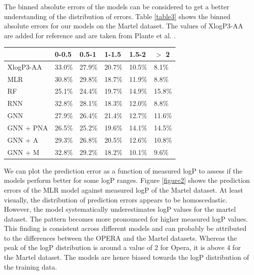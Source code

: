 \documentclass{article}
\theoremstyle{definition}
\theoremstyle{remark}
\begin{document}
The binned absolute errors of the models can be considered to get a better understanding of the distribution of errors. Table \ref{table3} shows the binned absolute errors for our models on the Martel dataset. The values of XlogP3-AA are added for reference and are taken from Plante et al. \cite{plante2018jplogp}. \\

\begin{center}
\begin{tabular}{ | m{2.0cm} | m{1.0cm}| m{1.0cm}| m{1.0cm}| m{1.0cm}| m{1.0cm}| } 
  \hline
   & 0-0.5 & 0.5-1 & 1-1.5 & 1.5-2 & $>$ 2  \\ 
   \hline
   XlogP3-AA & 33.0\% & 27.9\% & 20.7\% & 10.5\% & 8.1\%  \\
  \hline
   MLR & 30.8\% & 29.8\% & 18.7\% & 11.9\% & 8.8\%  \\ 
  \hline
  RF & 25.1\% & 24.4\% & 19.7\% & 14.9\% & 15.8\%  \\ 
  \hline
  RNN & 32.8\% & 28.1\% & 18.3\% & 12.0\% & 8.8\%  \\ 
  \hline
  GNN & 27.9\% & 26.4\% & 21.4\% & 12.7\% & 11.6\%  \\ 
  \hline
  GNN + PNA & 26.5\% & 25.2\% & 19.6\% & 14.1\% & 14.5\%  \\ 
  \hline
  GNN + A & 29.3\% & 26.8\% & 20.5\% & 12.6\% & 10.8\% \\ 
  \hline
  GNN + M & 32.8\% & 29.2\% & 18.2\% & 10.1\% & 9.6\% \\ 
  \hline

\end{tabular}
\captionsetup{width=0.8\textwidth}
\label{table3}
\end{center}

We can plot the prediction error as a function of measured logP to assess if the models perform better for some logP ranges. Figure \ref{figure2} shows the prediction errors of the MLR model against measured logP of the Martel dataset. At least visually, the distribution of prediction errors appears to be homoscedastic. However, the model systematically underestimates logP values for the martel dataset. The pattern becomes more pronounced for higher measured logP values. This finding is consistent across different models and can probably be attributed to the differences between the OPERA and the Martel datasets. Whereas the peak of the logP distribution is around a value of 2 for Opera, it is above 4 for the Martel dataset. The models are hence biased towards the logP distribution of the training data.
\end{document}
